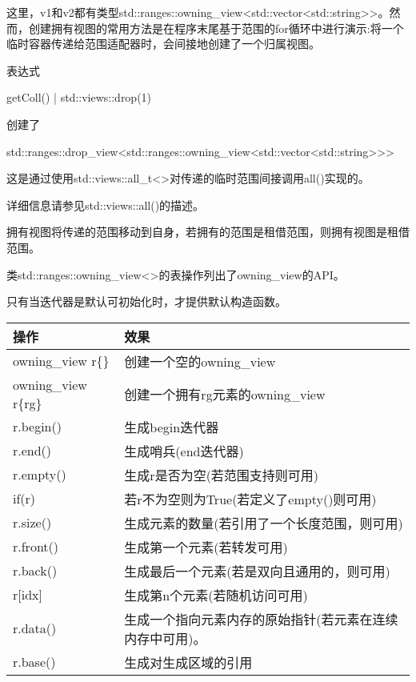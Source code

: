 这里，v1和v2都有类型std::ranges::owning\_view<std::vector<std::string>{}>。然而，创建拥有视图的常用方法是在程序末尾基于范围的for循环中进行演示:将一个临时容器传递给范围适配器时，会间接地创建了一个归属视图。

表达式

\begin{cpp}
getColl() | std::views::drop(1)
\end{cpp}

创建了

\begin{cpp}
std::ranges::drop_view<std::ranges::owning_view<std::vector<std::string>>>
\end{cpp}

这是通过使用std::views::all\_t<>对传递的临时范围间接调用all()实现的。

详细信息请参见std::views::all()的描述。



拥有视图将传递的范围移动到自身，若拥有的范围是租借范围，则拥有视图是租借范围。


类std::ranges::owning\_view<>的表操作列出了owning\_view的API。

只有当迭代器是默认可初始化时，才提供默认构造函数。

\begin{longtable}[c]{|l|l|}
\hline
\textbf{操作}   & \textbf{效果}                                                \\ \hline
\endfirsthead
%
\endhead
%
owning\_view r\{\}   & 创建一个空的owning\_view                          \\ \hline
owning\_view r\{rg\} & 创建一个拥有rg元素的owning\_view           \\ \hline
r.begin()            & 生成begin迭代器                                      \\ \hline
r.end()              & 生成哨兵(end迭代器)                            \\ \hline
r.empty()            & 生成r是否为空(若范围支持则可用)  \\ \hline
if(r)                & 若r不为空则为True(若定义了empty()则可用)       \\ \hline
r.size() & 生成元素的数量(若引用了一个长度范围，则可用)                             \\ \hline
r.front()            & 生成第一个元素(若转发可用)              \\ \hline
r.back()             & 生成最后一个元素(若是双向且通用的，则可用) \\ \hline
r{[}idx{]}           & 生成第n个元素(若随机访问可用)            \\ \hline
r.data() & 生成一个指向元素内存的原始指针(若元素在连续内存中可用)。 \\ \hline
r.base()             & 生成对生成区域的引用                  \\ \hline
\end{longtable}

